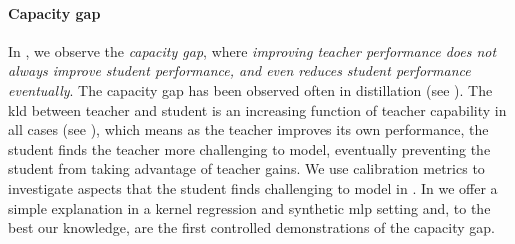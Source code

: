 \paragraph{Capacity gap}
In , 
we observe the \emph{capacity gap}, where \emph{improving teacher performance does not always improve student performance, and even reduces student performance eventually}.
The capacity gap has been observed often in distillation (see ).
The \gls{kld} between teacher and student is an increasing function of teacher capability in all cases (see ), which means as the teacher improves its own performance, the student finds the teacher more challenging to model, eventually preventing the student from taking advantage of teacher gains.
We use calibration metrics to investigate aspects that the student finds challenging to model in  .
In  we offer a simple explanation in a kernel regression and synthetic \gls{mlp} setting and,  to the best our knowledge, are the first controlled demonstrations of the capacity gap.


